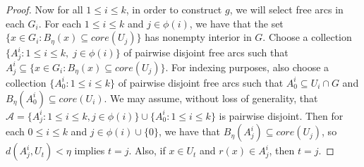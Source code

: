 \documentclass[10pt,a4paper]{amsart}
\numberwithin{equation}{section}
\begin{document}
\begin{proof}
%
%

Now for all $1\leq i \leq k$, in order to construct $g$, we will select free arcs in each $G_i$. For each $1\leq i \leq k$ and $j\in \phi(i)$, we have that the set $\{x\in G_i: B_\eta(x)\subseteq core(U_j)\}$ has nonempty interior in $G$. Choose a collection $\{A^i_j: 1\leq i\leq k,\; j\in \phi(i)\}$ of pairwise disjoint free arcs such that $A_j^i\subseteq \{x\in G_i: B_\eta(x)\subseteq core(U_j)\} $. For indexing purposes, also choose a collection $\{A_0^i: 1\leq i\leq k \}$ of pairwise disjoint free arcs such that $A^i_0\subseteq U_i\cap G$ and $B_\eta(A_0^i)\subseteq core(U_i)$. We may assume, without loss of generality, that $\mathcal A =\{A^i_j: 1\leq i\leq k, j\in \phi(i)\}\cup  \{A_0^i: 1\leq i\leq k \}$  is pairwise disjoint. Then for each $0\leq i\leq k$ and $j\in \phi(i)\cup \{0\}$, we have that $B_\eta(A_j^i)\subseteq core(U_j)$, so $d(A_j^i,U_t)<\eta$ implies $t=j$. Also, if $x\in U_t$ and $r(x)\in A_j^i$, then $t=j.$


\end{proof}
\end{document}
